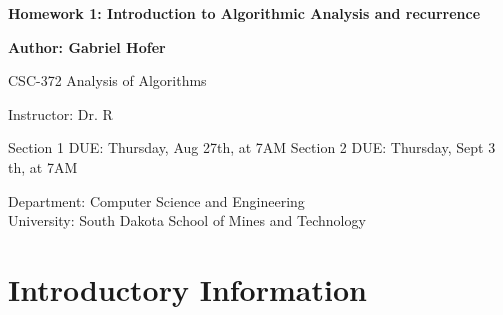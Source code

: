 \documentclass[12pt]{article}
\begin{document}
\begin{titlepage}
   \begin{center}
       \vspace*{1cm}
       \large
       \textbf{Homework 1: Introduction to Algorithmic Analysis and recurrence}
       \normalsize

       \vspace{0.5cm}

       \textbf{Author: Gabriel Hofer}

       \vspace{0.5cm}

       CSC-372 Analysis of Algorithms

       \vspace{0.5cm}

       Instructor: Dr. R

       \vspace{0.5cm}

       Section 1 DUE: Thursday, Aug 27th, at 7AM  \newline
       Section 2 DUE: Thursday, Sept 3 th, at 7AM  

       \vfill

       Department: Computer Science and Engineering\\
       University: South Dakota School of Mines and Technology\\

   \end{center}
\end{titlepage}
\newpage
\section{Introductory Information}
\end{document}
